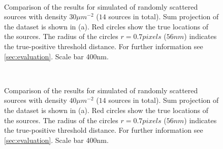 \begin{figure}[!h]
	\centering
	\newcommand{\sizef}{.95}
	\\
	\caption{Comparison of the results for simulated of randomly scattered sources with density $30\unit{\mu m^{-2}}$ ($14$ sources in total). Sum projection of the dataset is shown in (a). Red circles show the true locations of the sources. The radius of the circles $r=0.7\unit{pixels}$ ($56\unit{nm}$) indicates the true-positive threshold distance. For further information see \autoref{sec:evaluation}. Scale bar 400\unit{nm}.}
	\label{fig:comparison density 30}
\end{figure}

\begin{figure}[!h]
	\centering
	\newcommand{\sizef}{.95}
	\\
	\caption{Comparison of the results for simulated of randomly scattered sources with density $40\unit{\mu m^{-2}}$ ($14$ sources in total). Sum projection of the dataset is shown in (a). Red circles show the true locations of the sources. The radius of the circles $r=0.7\unit{pixels}$ ($56\unit{nm}$) indicates the true-positive threshold distance. For further information see \autoref{sec:evaluation}. Scale bar 400\unit{nm}.}
	\label{fig:comparison density 40}
\end{figure}



